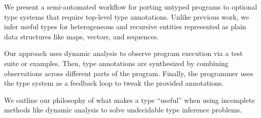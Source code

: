 %






We present a semi-automated workflow for porting
untyped programs to optional type systems that require top-level
type annotations.
Unlike previous work, we infer useful types for
heterogeneous and recursive entities
represented as plain data structures like maps, vectors, and sequences.

Our approach uses dynamic analysis to observe program execution
via a test suite or examples.
Then, type annotations are synthesized by
combining observations across different parts of the program.
Finally, the programmer uses the type system
as a feedback loop to tweak the provided annotations.

We outline our philosophy
of what makes a type ``useful''
when using incomplete methods like dynamic analysis to
solve undecidable type inference problems.


